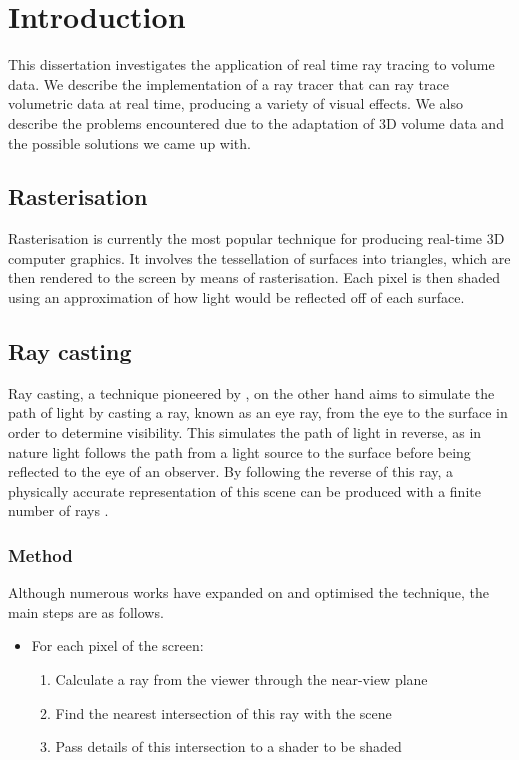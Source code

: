 \chapter{Introduction}
\label{intro}
This dissertation investigates the application of real time ray tracing to volume data. We describe the implementation of a ray tracer that can ray trace volumetric data at real time, producing a variety of visual effects. We also describe the problems encountered due to the adaptation of 3D volume data and the possible solutions we came up with.

\section{Rasterisation}
Rasterisation is currently the most popular technique for producing real-time 3D computer graphics. It involves the tessellation of surfaces into triangles, which are then rendered to the screen by means of rasterisation. Each pixel is then shaded using an approximation of how light would be reflected off of each surface.

\section{Ray casting}
Ray casting, a technique pioneered by \cite{appel68raytracing}, on the other hand aims to simulate the path of light by casting a ray, known as an eye ray, from the eye to the surface in order to determine visibility. This simulates the path of light in reverse, as in nature light follows the path from a light source to the surface before being reflected to the eye of an observer. By following the reverse of this ray, a physically accurate representation of this scene can be produced with a finite number of rays \parencite{appel68raytracing}.

\subsection{Method}
Although numerous works have expanded on and optimised the technique, the main steps are as follows.

\let\oldlabelitemi\labelitemi
\renewcommand{\labelitemi}{}

\begin{itemize}
	\item For each pixel of the screen:

	\begin{enumerate}
		\item Calculate a ray from the viewer through the near-view plane
		\item Find the nearest intersection of this ray with the scene
		\item Pass details of this intersection to a shader to be shaded
	\end{enumerate}
\end{itemize}

